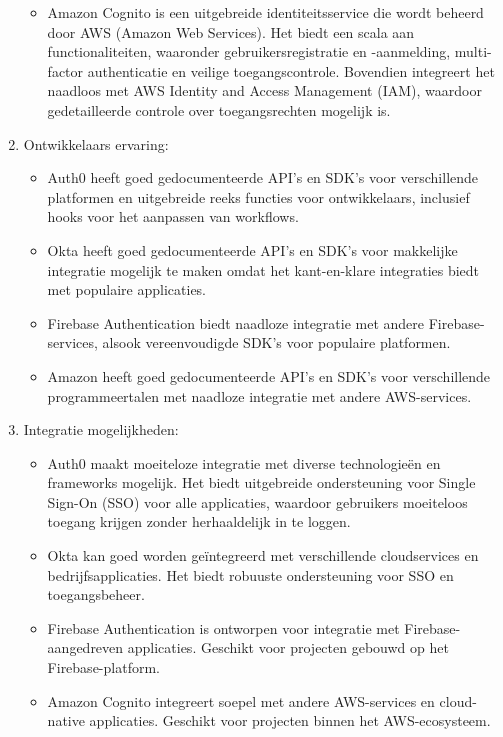 \begin{enumerate}
\begin{itemize}
    \item Amazon Cognito is een uitgebreide identiteitsservice die wordt beheerd door AWS (Amazon Web Services). Het biedt een scala aan functionaliteiten, waaronder gebruikersregistratie en -aanmelding, multi-factor authenticatie en veilige toegangscontrole. Bovendien integreert het naadloos met AWS Identity and Access Management (IAM), waardoor gedetailleerde controle over toegangsrechten mogelijk is.
  \end{itemize}
  
  \item Ontwikkelaars ervaring:
  \begin{itemize}
    \item Auth0 heeft goed gedocumenteerde API's en SDK's voor verschillende platformen en uitgebreide reeks functies voor ontwikkelaars, inclusief hooks voor het aanpassen van workflows.
    \item Okta heeft goed gedocumenteerde API's en SDK's voor makkelijke integratie mogelijk te maken omdat het kant-en-klare integraties biedt met populaire applicaties.
    \item Firebase Authentication biedt naadloze integratie met andere Firebase-services, alsook vereenvoudigde SDK's voor populaire platformen.
    \item Amazon heeft goed gedocumenteerde API's en SDK's voor verschillende programmeertalen met naadloze integratie met andere AWS-services.
  \end{itemize}
  
  \item Integratie mogelijkheden:
  \begin{itemize}
    \item Auth0 maakt moeiteloze integratie met diverse technologieën en frameworks mogelijk. Het biedt uitgebreide ondersteuning voor Single Sign-On (SSO) voor alle applicaties, waardoor gebruikers moeiteloos toegang krijgen zonder herhaaldelijk in te loggen.
    \item Okta kan goed worden geïntegreerd met verschillende cloudservices en bedrijfsapplicaties. Het biedt robuuste ondersteuning voor SSO en toegangsbeheer.
    \item Firebase Authentication is ontworpen voor integratie met Firebase-aangedreven applicaties. Geschikt voor projecten gebouwd op het Firebase-platform.
    \item Amazon Cognito integreert soepel met andere AWS-services en cloud-native applicaties. Geschikt voor projecten binnen het AWS-ecosysteem.
  \end{itemize}
  

\end{enumerate}

